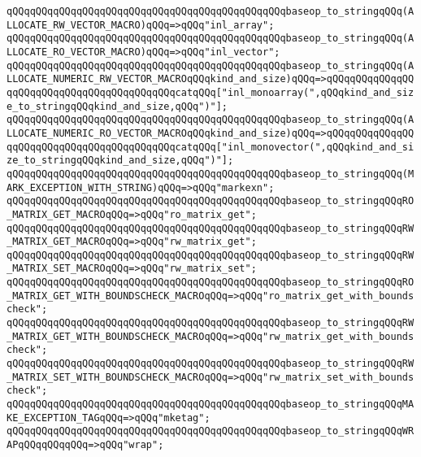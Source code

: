 \verb|qQQqqQQqqQQqqQQqqQQqqQQqqQQqqQQqqQQqqQQqqQQqqQQqbaseop_to_stringqQQq(ALLOCATE_RW_VECTOR_MACRO)qQQq=>qQQq"inl_array";|\newline
\verb|qQQqqQQqqQQqqQQqqQQqqQQqqQQqqQQqqQQqqQQqqQQqqQQqbaseop_to_stringqQQq(ALLOCATE_RO_VECTOR_MACRO)qQQq=>qQQq"inl_vector";|\newline
\verb|qQQqqQQqqQQqqQQqqQQqqQQqqQQqqQQqqQQqqQQqqQQqqQQqbaseop_to_stringqQQq(ALLOCATE_NUMERIC_RW_VECTOR_MACROqQQqkind_and_size)qQQq=>qQQqqQQqqQQqqQQqqQQqqQQqqQQqqQQqqQQqqQQqqQQqcatqQQq["inl_monoarray(",qQQqkind_and_size_to_stringqQQqkind_and_size,qQQq")"];|\newline
\verb|qQQqqQQqqQQqqQQqqQQqqQQqqQQqqQQqqQQqqQQqqQQqqQQqbaseop_to_stringqQQq(ALLOCATE_NUMERIC_RO_VECTOR_MACROqQQqkind_and_size)qQQq=>qQQqqQQqqQQqqQQqqQQqqQQqqQQqqQQqqQQqqQQqqQQqcatqQQq["inl_monovector(",qQQqkind_and_size_to_stringqQQqkind_and_size,qQQq")"];|\newline
\verb|qQQqqQQqqQQqqQQqqQQqqQQqqQQqqQQqqQQqqQQqqQQqqQQqbaseop_to_stringqQQq(MARK_EXCEPTION_WITH_STRING)qQQq=>qQQq"markexn";|\newline
\newline
\verb|qQQqqQQqqQQqqQQqqQQqqQQqqQQqqQQqqQQqqQQqqQQqqQQqbaseop_to_stringqQQqRO_MATRIX_GET_MACROqQQq=>qQQq"ro_matrix_get";|\newline
\verb|qQQqqQQqqQQqqQQqqQQqqQQqqQQqqQQqqQQqqQQqqQQqqQQqbaseop_to_stringqQQqRW_MATRIX_GET_MACROqQQq=>qQQq"rw_matrix_get";|\newline
\verb|qQQqqQQqqQQqqQQqqQQqqQQqqQQqqQQqqQQqqQQqqQQqqQQqbaseop_to_stringqQQqRW_MATRIX_SET_MACROqQQq=>qQQq"rw_matrix_set";|\newline
\newline
\verb|qQQqqQQqqQQqqQQqqQQqqQQqqQQqqQQqqQQqqQQqqQQqqQQqbaseop_to_stringqQQqRO_MATRIX_GET_WITH_BOUNDSCHECK_MACROqQQq=>qQQq"ro_matrix_get_with_boundscheck";|\newline
\verb|qQQqqQQqqQQqqQQqqQQqqQQqqQQqqQQqqQQqqQQqqQQqqQQqbaseop_to_stringqQQqRW_MATRIX_GET_WITH_BOUNDSCHECK_MACROqQQq=>qQQq"rw_matrix_get_with_boundscheck";|\newline
\verb|qQQqqQQqqQQqqQQqqQQqqQQqqQQqqQQqqQQqqQQqqQQqqQQqbaseop_to_stringqQQqRW_MATRIX_SET_WITH_BOUNDSCHECK_MACROqQQq=>qQQq"rw_matrix_set_with_boundscheck";|\newline
\newline
\verb|qQQqqQQqqQQqqQQqqQQqqQQqqQQqqQQqqQQqqQQqqQQqqQQqbaseop_to_stringqQQqMAKE_EXCEPTION_TAGqQQq=>qQQq"mketag";|\newline
\verb|qQQqqQQqqQQqqQQqqQQqqQQqqQQqqQQqqQQqqQQqqQQqqQQqbaseop_to_stringqQQqWRAPqQQqqQQqqQQq=>qQQq"wrap";|\newline
